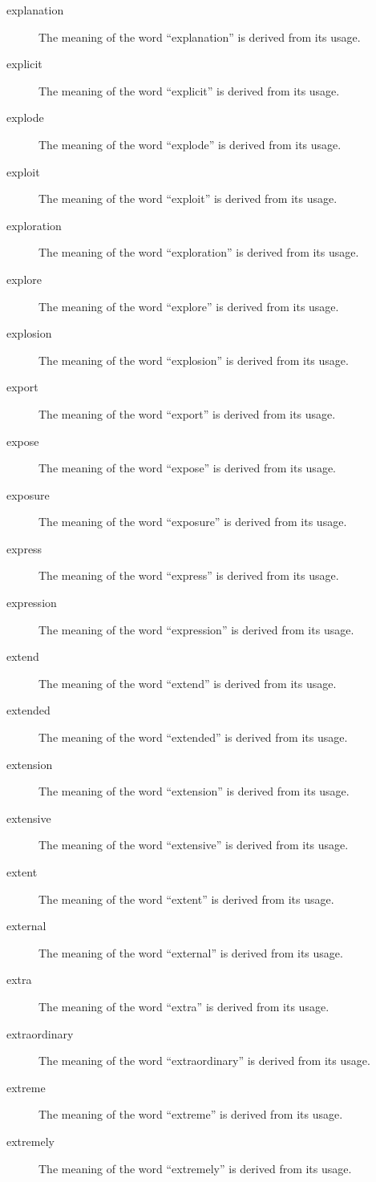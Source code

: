 \documentclass[12pt, letterpaper]{memoir}
\begin{document}
\begin{description}
\item[explanation] The meaning of the word ``explanation'' is derived from its usage.
\item[explicit] The meaning of the word ``explicit'' is derived from its usage.
\item[explode] The meaning of the word ``explode'' is derived from its usage.
\item[exploit] The meaning of the word ``exploit'' is derived from its usage.
\item[exploration] The meaning of the word ``exploration'' is derived from its usage.
\item[explore] The meaning of the word ``explore'' is derived from its usage.
\item[explosion] The meaning of the word ``explosion'' is derived from its usage.
\item[export] The meaning of the word ``export'' is derived from its usage.
\item[expose] The meaning of the word ``expose'' is derived from its usage.
\item[exposure] The meaning of the word ``exposure'' is derived from its usage.
\item[express] The meaning of the word ``express'' is derived from its usage.
\item[expression] The meaning of the word ``expression'' is derived from its usage.
\item[extend] The meaning of the word ``extend'' is derived from its usage.
\item[extended] The meaning of the word ``extended'' is derived from its usage.
\item[extension] The meaning of the word ``extension'' is derived from its usage.
\item[extensive] The meaning of the word ``extensive'' is derived from its usage.
\item[extent] The meaning of the word ``extent'' is derived from its usage.
\item[external] The meaning of the word ``external'' is derived from its usage.
\item[extra] The meaning of the word ``extra'' is derived from its usage.
\item[extraordinary] The meaning of the word ``extraordinary'' is derived from its usage.
\item[extreme] The meaning of the word ``extreme'' is derived from its usage.
\item[extremely] The meaning of the word ``extremely'' is derived from its usage.

\end{description}
\end{document}
